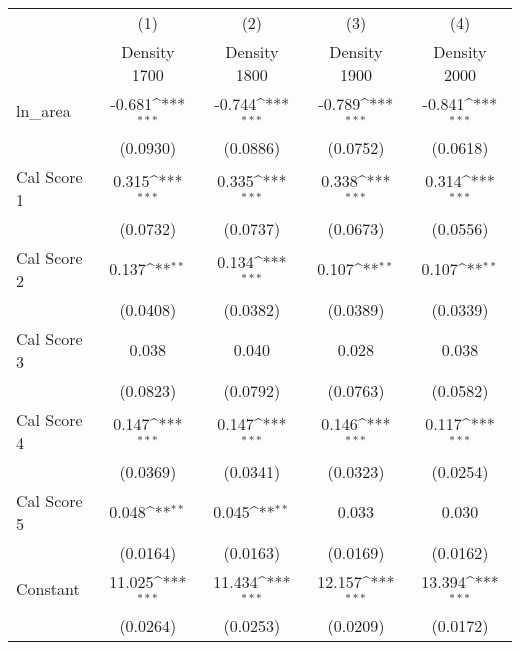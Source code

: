 {
\def\sym#1{\ifmmode^{#1}\else\(^{#1}\)\fi}
\begin{tabular}{l*{4}{c}}
\toprule
                    &\multicolumn{1}{c}{(1)}&\multicolumn{1}{c}{(2)}&\multicolumn{1}{c}{(3)}&\multicolumn{1}{c}{(4)}\\
                    &\multicolumn{1}{c}{Density 1700}&\multicolumn{1}{c}{Density 1800}&\multicolumn{1}{c}{Density 1900}&\multicolumn{1}{c}{Density 2000}\\
\midrule
ln\_area             &      -0.681\sym{***}&      -0.744\sym{***}&      -0.789\sym{***}&      -0.841\sym{***}\\
                    &    (0.0930)         &    (0.0886)         &    (0.0752)         &    (0.0618)         \\
\addlinespace
Cal Score 1         &       0.315\sym{***}&       0.335\sym{***}&       0.338\sym{***}&       0.314\sym{***}\\
                    &    (0.0732)         &    (0.0737)         &    (0.0673)         &    (0.0556)         \\
\addlinespace
Cal Score 2         &       0.137\sym{**} &       0.134\sym{***}&       0.107\sym{**} &       0.107\sym{**} \\
                    &    (0.0408)         &    (0.0382)         &    (0.0389)         &    (0.0339)         \\
\addlinespace
Cal Score 3         &       0.038         &       0.040         &       0.028         &       0.038         \\
                    &    (0.0823)         &    (0.0792)         &    (0.0763)         &    (0.0582)         \\
\addlinespace
Cal Score 4         &       0.147\sym{***}&       0.147\sym{***}&       0.146\sym{***}&       0.117\sym{***}\\
                    &    (0.0369)         &    (0.0341)         &    (0.0323)         &    (0.0254)         \\
\addlinespace
Cal Score 5         &       0.048\sym{**} &       0.045\sym{**} &       0.033         &       0.030         \\
                    &    (0.0164)         &    (0.0163)         &    (0.0169)         &    (0.0162)         \\
\addlinespace
Constant            &      11.025\sym{***}&      11.434\sym{***}&      12.157\sym{***}&      13.394\sym{***}\\
                    &    (0.0264)         &    (0.0253)         &    (0.0209)         &    (0.0172)         \\

\end{tabular}}
